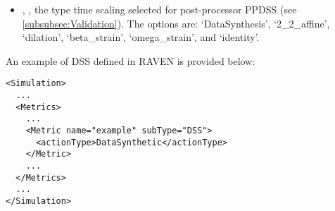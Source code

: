 \begin{itemize}
  \item {}, , the type time scaling selected for post-processor PPDSS (see \ref{subsubsec:Validation}).
                                                                The options are: `DataSynthesis', `2_2_affine', `dilation', `beta_strain', `omega_strain', and `identity'.
\end{itemize}

An example of DSS  defined in RAVEN is provided below:
\begin{lstlisting}[style=XML]
<Simulation>
  ...
  <Metrics>
    ...
    <Metric name="example" subType="DSS">
      <actionType>DataSynthetic</actionType>
    </Metric>
    ...
  </Metrics>
  ...
</Simulation>
\end{lstlisting}
